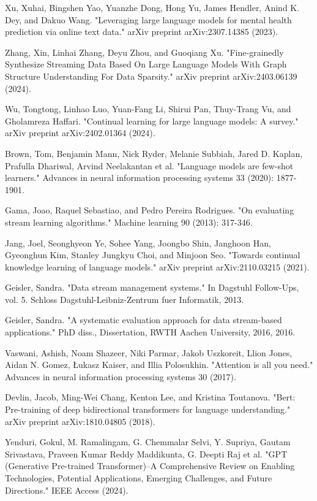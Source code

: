 \documentclass[runningheads]{llncs}
\begin{document}
\begin{thebibliography}{8}
Xu, Xuhai, Bingshen Yao, Yuanzhe Dong, Hong Yu, James Hendler, Anind K. Dey, and Dakuo Wang. "Leveraging large language models for mental health prediction via online text data." arXiv preprint arXiv:2307.14385 (2023).

Zhang, Xin, Linhai Zhang, Deyu Zhou, and Guoqiang Xu. "Fine-grainedly Synthesize Streaming Data Based On Large Language Models With Graph Structure Understanding For Data Sparsity." arXiv preprint arXiv:2403.06139 (2024).

Wu, Tongtong, Linhao Luo, Yuan-Fang Li, Shirui Pan, Thuy-Trang Vu, and Gholamreza Haffari. "Continual learning for large language models: A survey." arXiv preprint arXiv:2402.01364 (2024).

Brown, Tom, Benjamin Mann, Nick Ryder, Melanie Subbiah, Jared D. Kaplan, Prafulla Dhariwal, Arvind Neelakantan et al. "Language models are few-shot learners." Advances in neural information processing systems 33 (2020): 1877-1901.

Gama, Joao, Raquel Sebastiao, and Pedro Pereira Rodrigues. "On evaluating stream learning algorithms." Machine learning 90 (2013): 317-346.

Jang, Joel, Seonghyeon Ye, Sohee Yang, Joongbo Shin, Janghoon Han, Gyeonghun Kim, Stanley Jungkyu Choi, and Minjoon Seo. "Towards continual knowledge learning of language models." arXiv preprint arXiv:2110.03215 (2021).

Geisler, Sandra. "Data stream management systems." In Dagstuhl Follow-Ups, vol. 5. Schloss Dagstuhl-Leibniz-Zentrum fuer Informatik, 2013.

Geisler, Sandra. "A systematic evaluation approach for data stream-based applications." PhD diss., Dissertation, RWTH Aachen University, 2016, 2016.

Vaswani, Ashish, Noam Shazeer, Niki Parmar, Jakob Uszkoreit, Llion Jones, Aidan N. Gomez, Łukasz Kaiser, and Illia Polosukhin. "Attention is all you need." Advances in neural information processing systems 30 (2017).

Devlin, Jacob, Ming-Wei Chang, Kenton Lee, and Kristina Toutanova. "Bert: Pre-training of deep bidirectional transformers for language understanding." arXiv preprint arXiv:1810.04805 (2018).

Yenduri, Gokul, M. Ramalingam, G. Chemmalar Selvi, Y. Supriya, Gautam Srivastava, Praveen Kumar Reddy Maddikunta, G. Deepti Raj et al. "GPT (Generative Pre-trained Transformer)–A Comprehensive Review on Enabling Technologies, Potential Applications, Emerging Challenges, and Future Directions." IEEE Access (2024).


\end{thebibliography}
\end{document}
